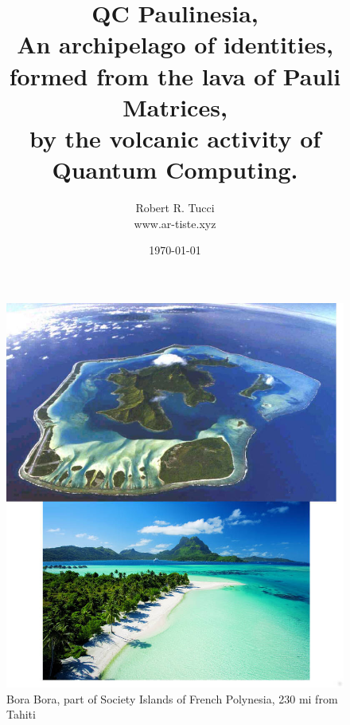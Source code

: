 \documentclass[12pt]{report}
\begin{document}
\title{\textbf{QC Paulinesia},\\
\normalsize{An archipelago of identities,\\
formed from the lava of Pauli Matrices,\\
by the volcanic activity of Quantum Computing.}}


\author{Robert R. Tucci\\
        www.ar-tiste.xyz}


\date{ \today}
\maketitle

       \begin{figure}[h]
\centering
            \noindent\includegraphics[width=5in]{bora-bora-air.jpg}
            \caption{Bora Bora, part of Society Islands of French Polynesia, 230 mi from Tahiti}
      \end{figure}
\end{document}
